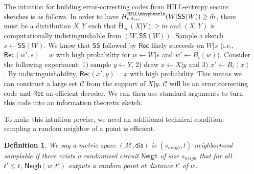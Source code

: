 \documentclass[11pt]{article}
\newcommand{\class}[1]{{\ensuremath{\mathsf{#1}}}}
\newcommand{\sketch}{\ensuremath{\class{SS}}\xspace}
\newcommand{\rec}{\ensuremath{\class{Rec}}\xspace}
\newcommand{\sample}{\ensuremath{\class{Sample}}\xspace}
\newcommand{\neigh}{\ensuremath{\class{Neigh}}\xspace}
\newcommand{\dis}{\ensuremath{\mathsf{dis}}}
\newcommand{\hillrlx}{\ensuremath{\mathtt{HILL\mhyphen rlx}}\xspace}
\newcommand{\Hav}{\tilde{\mathrm{H}}_\infty}
\newtheorem{definition}[theorem]{Definition}
\newcommand{\authnote}[2]{{\textcolor{red}{\textsf{#1 notes: }\textcolor{blue}{ #2}}\marginpar{\textcolor{red}{\textbf{!!!!!}}}}}
\newcommand{\authnote}[2]{}
\newcommand{\lnote}[1]{{\authnote{Leo}{#1}}}
\begin{document}
The intuition for building error-correcting codes from HILL-entropy secure sketches is as follows.  In order to have  $H^{\hillrlx}_{\epsilon, s_{sec}}(W|\sketch(W))\ge \tilde{m}$, there must be a distribution $X, Y$ such that $\Hav(X | Y)\geq \tilde{m}$ and $(X, Y)$ is computationally indistinguishable from $(W, \sketch(W))$.  Sample a sketch $s\leftarrow \sketch(W)$. We know that $\sketch$ followed by $\rec$ likely succeeds on $W|s$  (i.e., $\rec (w', s) = w$ with high probability for $w\leftarrow W|s$ and $w'\leftarrow B_t(w)$).  %
 Consider the following experiment: 1) sample $y\leftarrow Y$, 2) draw $x\leftarrow X|y$ and 3) $x'\leftarrow B_t(x)$. By indistinguishability, $\rec (x',y) = x$ with high probability.
 This means we can construct a large set $\mathcal{C}$ from the support of $X|y$.  $\mathcal{C}$ will be an error correcting code and $\rec$ an efficient decoder.  We can then use standard arguments to turn this code into an information theoretic sketch.  


To make this intuition precise, we need an additional technical condition:  sampling a random neighbor of a point is efficient.
\begin{definition}
\label{def:neighborhood samplable}
We say a metric space $(\mathcal{M}, \dis)$ is $(s_{neigh}, t)$-\emph{neighborhood samplable} if there exists a randomized circuit $\neigh$ of size $s_{neigh}$ that for all $t'\leq t$, $\neigh (w, t')$ outputs a random point at distance $t'$ of $w$.  
\end{definition}
\end{document}
